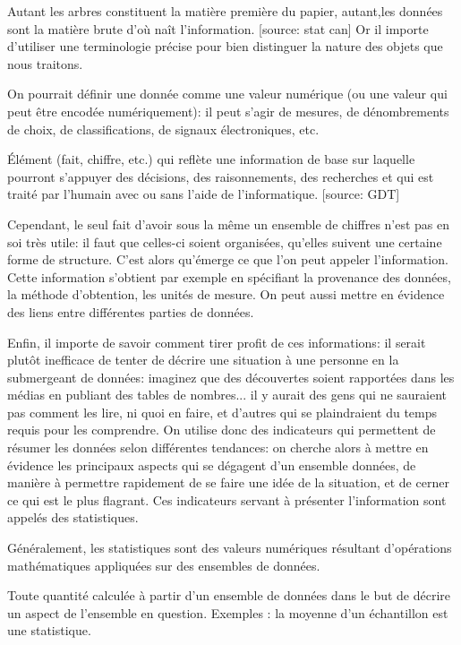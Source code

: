 \documentclass[11pt,fleqn]{book} %
\begin{document}
Autant les arbres constituent la matière première du papier, autant,les données sont la matière brute d'où naît l'information. [source: stat can]
Or il importe d'utiliser une terminologie précise pour bien distinguer la nature des objets que nous traitons.

On pourrait définir une donnée comme une valeur numérique (ou une valeur qui peut être encodée numériquement): il peut s'agir de mesures, de dénombrements de choix, de classifications, de signaux électroniques, etc.

\begin{definition}[donnée]
Élément (fait, chiffre, etc.) qui reflète une information de base sur laquelle pourront s'appuyer des décisions, des raisonnements, des recherches et qui est traité par l'humain avec ou sans l'aide de l'informatique.  [source: GDT]
\end{definition}

Cependant, le seul fait d'avoir sous la même un ensemble de chiffres n'est pas en soi très utile: il faut que celles-ci soient organisées, qu'elles suivent une certaine forme de structure. C'est alors qu'émerge ce que l'on peut appeler l'information. Cette information s'obtient par exemple en spécifiant la provenance des données, la méthode d'obtention, les unités de mesure. On peut aussi mettre en évidence des liens entre différentes parties de données.

Enfin, il importe de savoir comment tirer profit de ces informations: il serait plutôt inefficace de tenter de décrire une situation à une personne en la submergeant de données: imaginez que des découvertes soient rapportées dans les médias en publiant des tables de nombres... il y aurait des gens qui ne sauraient pas comment les lire, ni quoi en faire, et d'autres qui se plaindraient du temps requis pour les comprendre. On utilise donc des indicateurs qui permettent de résumer les données selon différentes tendances: on cherche alors à mettre en évidence les principaux aspects qui se dégagent d'un ensemble données, de manière à permettre rapidement de se faire une idée de la situation, et de cerner ce qui est le plus flagrant. Ces indicateurs servant à présenter l'information sont appelés des statistiques.

Généralement, les statistiques sont des valeurs numériques résultant  d'opérations mathématiques appliquées sur des ensembles de données.

\begin{definition}[statistique]
Toute quantité calculée à partir d'un ensemble de données dans le but de décrire un aspect de l'ensemble en question. Exemples : la moyenne d'un échantillon est une statistique.  
\end{definition}
\end{document}
